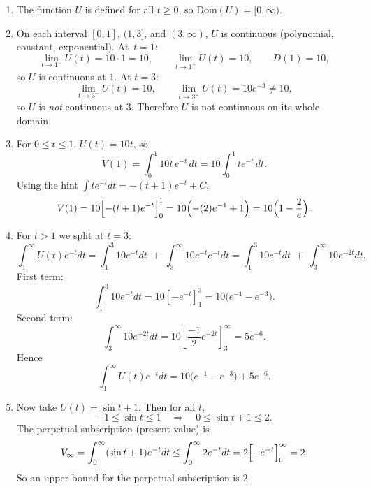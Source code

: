 \documentclass[11pt]{exam}
\begin{document}
\begin{questions}
\begin{solution}[0cm]
\begin{enumerate}[leftmargin = 0.5cm, label = (\alph*), rightmargin = 0.2cm]
    \item The function $U$ is defined for all $t \ge 0$, so $\mathrm{Dom}(U) = [0,\infty)$.

    \item On each interval $[0,1]$, $(1,3]$, and $(3,\infty)$, $U$ is continuous (polynomial, constant, exponential).  
    At~$t=1$:
    \[
        \lim_{t\to 1^-} U(t) = 10\cdot 1 = 10, \qquad
        \lim_{t\to 1^+} U(t) = 10, \qquad D(1)=10,
    \]
    so $U$ is continuous at $1$.  
    At $t=3$:
    \[
        \lim_{t\to 3^-} U(t) = 10,\qquad
        \lim_{t\to 3^+} U(t) = 10e^{-3} \neq 10,
    \]
    so $U$ is \emph{not} continuous at $3$.  
    Therefore $U$ is not continuous on its whole domain.

    \item For $0 \le t \le 1$, $U(t) = 10t$, so
    \[
        V(1) = \int_{0}^{1} 10t\,e^{-t}\,dt
             = 10 \int_{0}^{1} t e^{-t}\,dt.
    \]
    Using the hint $\int t e^{-t}dt = -(t+1)e^{-t} + C$,
    \[
        V(1) = 10\Bigl[-(t+1)e^{-t}\Bigr]_{0}^{1}
             = 10\Bigl(-(2)e^{-1} + 1\Bigr)
             = 10\Bigl(1 - \frac{2}{e}\Bigr).
    \]

    \item For $t>1$ we split at $t=3$:
    \[
        \int_{1}^{\infty} U(t)e^{-t}dt
        = \int_{1}^{3} 10e^{-t}dt \;+\; \int_{3}^{\infty} 10e^{-t}e^{-t}dt
        = \int_{1}^{3} 10e^{-t}dt \;+\; \int_{3}^{\infty} 10e^{-2t}dt.
    \]
    First term:
    \[
        \int_{1}^{3} 10e^{-t}dt 
        = 10[-e^{-t}]_{1}^{3}
        = 10\bigl(e^{-1} - e^{-3}\bigr).
    \]
    Second term:
    \[
        \int_{3}^{\infty} 10e^{-2t}dt
        = 10\left[\frac{-1}{2}e^{-2t}\right]_{3}^{\infty}
        = 5e^{-6}.
    \]
    Hence
    \[
        \int_{1}^{\infty} U(t)e^{-t}dt
        = 10\bigl(e^{-1} - e^{-3}\bigr) + 5e^{-6}.
    \]

    \item Now take $U(t) = \sin t + 1$. Then for all $t$,
    \[
        -1 \le \sin t \le 1 \quad\Rightarrow\quad
        0 \le \sin t + 1 \le 2.
    \]
    The perpetual subscription (present value) is
    \[
        V_\infty = \int_{0}^{\infty} (\sin t + 1)e^{-t}dt
        \le \int_{0}^{\infty} 2e^{-t}dt
        = 2\Bigl[-e^{-t}\Bigr]_{0}^{\infty}
        = 2.
    \]
    So an upper bound for the perpetual subscription is $2$.

\end{enumerate}

\end{solution}


\end{questions}	
\end{document}
